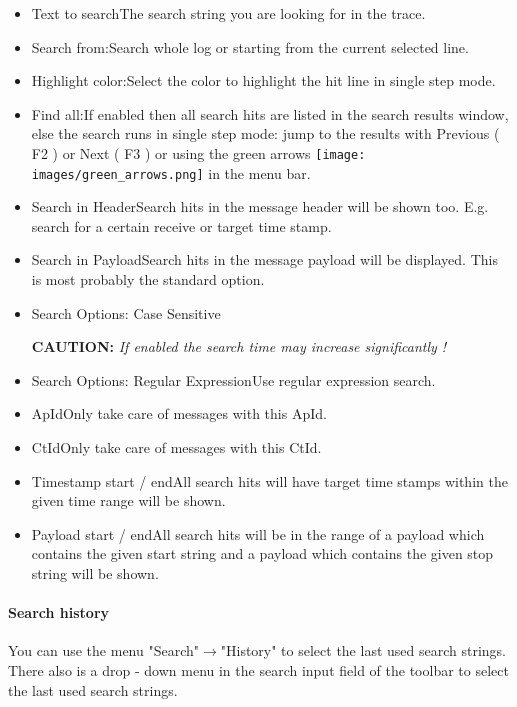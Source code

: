 \documentclass[a4paper,11pt]{article}
\newcommand{\caution}[1]{\begin{ibox} \textbf{CAUTION:} \emph{#1} \end{ibox}}
\begin{document}
\begin{itemize}
 \item Text to search\linebreak The search string you are looking for in the trace.
 \item Search from:\linebreak Search whole log or starting from the current selected line.
 \item Highlight color:\linebreak Select the color to highlight the hit line in single step mode.
 \item Find all:\linebreak If enabled then all search hits are listed in the search results window, else the search runs in single step mode:
 jump to the results with Previous ( F2 ) or Next ( F3 ) or  using the green arrows \texttt{[image: images/green\_arrows.png]} in the menu bar.
 \item Search in Header\linebreak Search hits in the message header will be shown too. E.g. search for a certain receive or target time stamp.
 \item Search in Payload\linebreak Search hits in the message payload will be displayed. This is most probably the standard option.
 \item Search Options: Case Sensitive\linebreak \caution{If enabled the search time may increase significantly !}
 \item Search Options: Regular Expression\linebreak Use regular expression search.
 \item ApId\linebreak Only take care of messages with this ApId.
 \item CtId\linebreak Only take care of messages with this CtId.
 \item Timestamp start / end\linebreak All search hits will have target time stamps within the given time range will be shown.
 \item Payload start / end\linebreak All search hits will be in the range of a payload which contains the given start
     string and a payload which contains the given stop string will be shown.
\end{itemize}


\paragraph{Search history}
You can use the menu "Search"\ensuremath{\rightarrow}"History" to select the last used search strings.
There also is a drop - down menu in the search input field of the toolbar to select the last used search strings.
\end{document}
